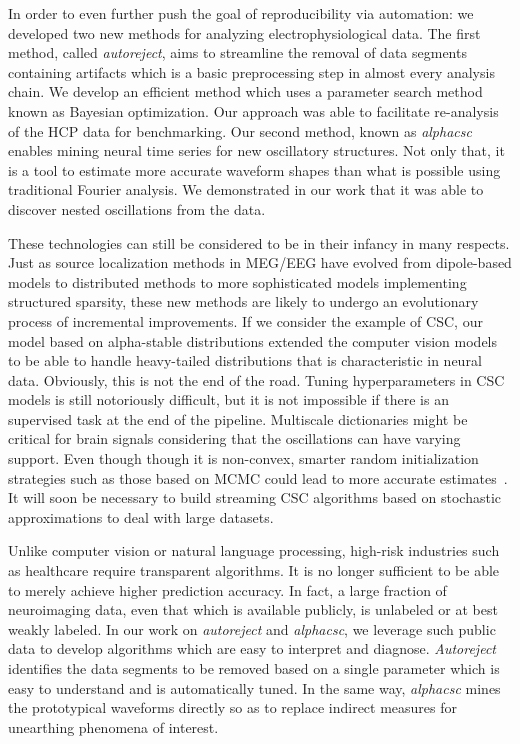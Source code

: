 In order to even further push the goal of reproducibility via automation: we developed two new methods for analyzing electrophysiological data. The first method, called \emph{autoreject}, aims to streamline the removal of data segments containing artifacts which is a basic preprocessing step in almost every analysis chain. We develop an efficient method which uses a parameter search method known as Bayesian optimization. Our approach was able to facilitate re-analysis of the \ac{HCP} data for benchmarking. Our second method, known as \emph{alphacsc} enables mining neural time series for new oscillatory structures. Not only that, it is a tool to estimate more accurate waveform shapes than what is possible using traditional Fourier analysis. We demonstrated in our work that it was able to discover nested oscillations from the data.

These technologies can still be considered to be in their infancy in many respects. Just as source localization methods in \ac{MEG}/\ac{EEG} have evolved from dipole-based models to distributed methods to more sophisticated models implementing structured sparsity, these new methods are likely to undergo an evolutionary process of incremental improvements. If we consider the example of \ac{CSC}, our model based on alpha-stable distributions extended the computer vision models to be able to handle heavy-tailed distributions that is characteristic in neural data. Obviously, this is not the end of the road. Tuning hyperparameters in \ac{CSC} models is still notoriously difficult, but it is not impossible if there is an supervised task at the end of the pipeline. Multiscale dictionaries might be critical for brain signals considering that the oscillations can have varying support. Even though though it is non-convex, smarter random initialization strategies such as those based on \ac{MCMC} could lead to more accurate estimates~\citep{bachem2016fast}. It will soon be necessary to build streaming \ac{CSC} algorithms based on stochastic approximations to deal with large datasets.

Unlike computer vision or natural language processing, high-risk industries such as healthcare require transparent algorithms. It is no longer sufficient to be able to merely achieve higher prediction accuracy. In fact, a large fraction of neuroimaging data, even that which is available publicly, is unlabeled or at best weakly labeled. In our work on \emph{autoreject} and \emph{alphacsc}, we leverage such public data to develop algorithms which are easy to interpret and diagnose. \emph{Autoreject} identifies the data segments to be removed based on a single parameter which is easy to understand and is automatically tuned. In the same way, \emph{alphacsc} mines the prototypical waveforms directly so as to replace indirect measures for unearthing phenomena of interest.


